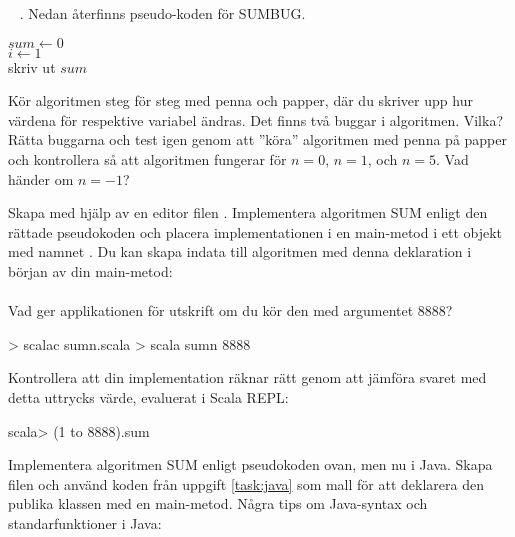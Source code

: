 \QUESTBEGIN

\Task  \what~ . Nedan återfinns pseudo-koden för SUMBUG.

\begin{algorithm}[H]

 $sum \leftarrow 0$ \\
 $i \leftarrow 1$  \\
 skriv ut $sum$
\end{algorithm}

\Subtask\Pen Kör algoritmen steg för steg med penna och papper, där du skriver upp hur värdena för respektive variabel ändras. Det finns två buggar i algoritmen. Vilka? Rätta buggarna och test igen genom att ''köra'' algoritmen med penna på papper och kontrollera så att algoritmen fungerar för $n=0$, $n=1$, och $n=5$. Vad händer om $n=-1$?

\Subtask Skapa med hjälp av en editor filen . Implementera algoritmen SUM enligt den rättade pseudokoden och placera implementationen i en main-metod i ett objekt med namnet . Du kan skapa indata  till algoritmen med denna deklaration i början av din main-metod: \\  \\ Vad ger applikationen för utskrift om du kör den med argumentet 8888?

\begin{REPLnonum}
> scalac sumn.scala
> scala sumn 8888
\end{REPLnonum}

\Subtask Kontrollera att din implementation räknar rätt genom att jämföra svaret med detta uttrycks värde, evaluerat i Scala REPL:
\begin{REPLnonum}
scala> (1 to 8888).sum
\end{REPLnonum}

\Subtask Implementera algoritmen SUM enligt pseudokoden ovan, men nu i Java. Skapa filen  och använd koden från uppgift \ref{task:java} som mall för att deklarera den publika klassen  med en main-metod. Några tips om Java-syntax och standarfunktioner i Java:

